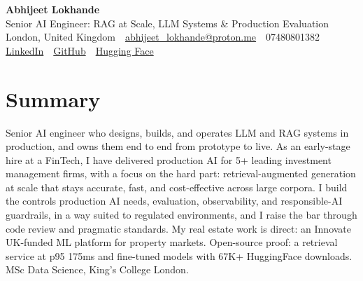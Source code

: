 \documentclass[10pt,a4paper]{article}
\newcommand{\sep}{\,\textcolor{accent!60}{\textbar}\,}
\begin{document}
\begin{center}
  {\fontsize{24}{26}\selectfont\bfseries Abhijeet Lokhande}\\[3pt]
  {\color{accent}\large Senior AI Engineer: RAG at Scale, LLM Systems \& Production Evaluation}\\[5pt]
  {\small
    London, United Kingdom \sep
    \href{mailto:abhijeet_lokhande@proton.me}{abhijeet\_lokhande@proton.me} \sep
    07480801382 \\[2pt]
    \href{https://www.linkedin.com/in/ablds/}{LinkedIn} \sep
    \href{https://github.com/abhijeetscode}{GitHub} \sep
    \href{https://huggingface.co/ab-ai}{Hugging Face}
  }
\end{center}
\vspace{2pt}

\section{Summary}
Senior AI engineer who designs, builds, and operates LLM and RAG systems in production, and owns them end to end from prototype to live. As an early-stage hire at a FinTech, I have delivered production AI for 5+ leading investment management firms, with a focus on the hard part: retrieval-augmented generation at scale that stays accurate, fast, and cost-effective across large corpora. I build the controls production AI needs, evaluation, observability, and responsible-AI guardrails, in a way suited to regulated environments, and I raise the bar through code review and pragmatic standards. My real estate work is direct: an Innovate UK-funded ML platform for property markets. Open-source proof: a retrieval service at p95 175ms and fine-tuned models with 67K+ HuggingFace downloads. MSc Data Science, King's College London.

\end{document}
